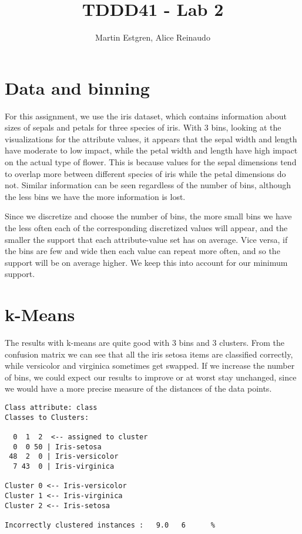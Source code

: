 \documentclass[]{article}
\title{TDDD41 - Lab 2}
\author{Martin Estgren, Alice Reinaudo}
\begin{document}
\maketitle

\section{Data and binning}
For this assignment, we use the iris dataset, which contains information about sizes of sepals and petals for three species of iris. With 3 bins, looking at the visualizations for the attribute values, it appears that the sepal width and length have moderate to low impact, while the petal width and length have high impact on the actual type of flower. This is because values for the sepal dimensions tend to overlap more between different species of iris while the petal dimensions do not. Similar information can be seen regardless of the number of bins, although the less bins we have the more information is lost.

Since we discretize and choose the number of bins, the more small bins we have the less often each of the corresponding discretized values will appear, and the smaller the support that each attribute-value set has on average. Vice versa, if the bins are few and wide then each value can repeat more often, and so the support will be on average higher. We keep this into account for our minimum support.

\section{k-Means}
The results with k-means are quite good with 3 bins and 3 clusters. From the confusion matrix we can see that all the iris setosa items are classified correctly, while versicolor and virginica sometimes get swapped. If we increase the number of bins, we could expect our results to improve or at worst stay unchanged, since we would have a more precise measure of the distances of the data points.

\begin{lstlisting}
Class attribute: class
Classes to Clusters:

  0  1  2  <-- assigned to cluster
  0  0 50 | Iris-setosa
 48  2  0 | Iris-versicolor
  7 43  0 | Iris-virginica

Cluster 0 <-- Iris-versicolor
Cluster 1 <-- Iris-virginica
Cluster 2 <-- Iris-setosa

Incorrectly clustered instances :	9.0	  6      %
\end{lstlisting}
\end{document}
